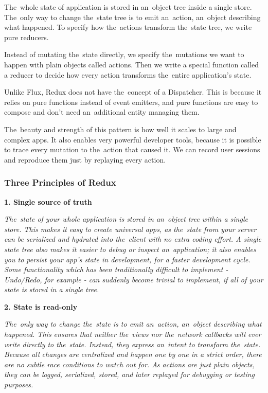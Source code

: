 The~whole state of application is stored in an~object tree inside a single store. The~only way to change the~state tree is to emit an~action, an~object describing what happened. To specify how the~actions transform the~state tree, we write pure reducers.\citep{redux-intro}

Instead of mutating the~state directly, we specify the~mutations we want to happen with plain objects called actions. Then we write a special function called a reducer to decide how every action transforms the~entire application's state.\citep{redux-intro}

Unlike Flux, Redux does not have the~concept of a Dispatcher. This is because it relies on pure functions instead of event emitters, and pure functions are easy to compose and don't need an~additional entity managing them.

The~beauty and strength of this pattern is how well it scales to large and complex apps. It also enables very powerful developer tools, because it is possible to trace every mutation to the~action that caused it. We can record user sessions and reproduce them just by replaying every action.\citep{redux-intro}

\subsubsection{Three Principles of Redux}
\textbf{1. Single source of truth}

\textsl{The~state of your whole application is stored in an~object tree within a single store. This makes it easy to create universal apps, as the~state from your server can be serialized and hydrated into the~client with no extra coding effort. A single state tree also makes it easier to debug or inspect an~application; it also enables you to persist your app's state in development, for a faster development cycle. Some functionality which has been traditionally difficult to implement - Undo/Redo, for example - can suddenly become trivial to implement, if all of your state is stored in a single tree.} \citep{redux-intro}

\textbf{2. State is read-only}

\textsl{The~only way to change the~state is to emit an~action, an~object describing what happened. This ensures that neither the~views nor the~network callbacks will ever write directly to the~state. Instead, they express an~intent to transform the~state. Because all changes are centralized and happen one by one in a strict order, there are no subtle race conditions to watch out for. As actions are just plain objects, they can be logged, serialized, stored, and later replayed for debugging or testing purposes.} \citep{redux-intro}

